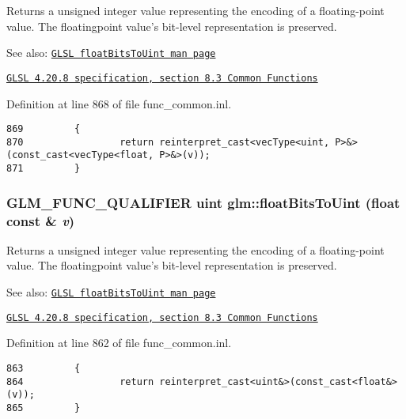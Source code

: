 Returns a unsigned integer value representing the encoding of a floating-point value. The floatingpoint value's bit-level representation is preserved.

\begin{Desc}
\item[See also:]\href{http://www.opengl.org/sdk/docs/manglsl/xhtml/floatBitsToUint.xml}{\tt GLSL floatBitsToUint man page} 

\href{http://www.opengl.org/registry/doc/GLSLangSpec.4.20.8.pdf}{\tt GLSL 4.20.8 specification, section 8.3 Common Functions} \end{Desc}


Definition at line 868 of file func\_\-common.inl.

\begin{Code}\begin{verbatim}869         {
870                 return reinterpret_cast<vecType<uint, P>&>(const_cast<vecType<float, P>&>(v));
871         }
\end{verbatim}
\end{Code}


\hypertarget{group__core__func__common_g748b4d2819b48d28ca09dc8733488873}{
\subsubsection[floatBitsToUint]{\setlength{\rightskip}{0pt plus 5cm}GLM\_\-FUNC\_\-QUALIFIER uint glm::floatBitsToUint (float const \& {\em v})}}
\label{group__core__func__common_g748b4d2819b48d28ca09dc8733488873}


Returns a unsigned integer value representing the encoding of a floating-point value. The floatingpoint value's bit-level representation is preserved.

\begin{Desc}
\item[See also:]\href{http://www.opengl.org/sdk/docs/manglsl/xhtml/floatBitsToUint.xml}{\tt GLSL floatBitsToUint man page} 

\href{http://www.opengl.org/registry/doc/GLSLangSpec.4.20.8.pdf}{\tt GLSL 4.20.8 specification, section 8.3 Common Functions} \end{Desc}


Definition at line 862 of file func\_\-common.inl.

\begin{Code}\begin{verbatim}863         {
864                 return reinterpret_cast<uint&>(const_cast<float&>(v));
865         }
\end{verbatim}
\end{Code}


